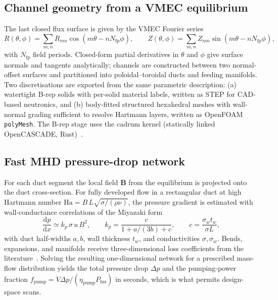 \documentclass{article}
\newcommand{\Ha}{\mathrm{Ha}}
\begin{document}
\subsection{Channel geometry from a VMEC equilibrium}

The last closed flux surface is given by the VMEC Fourier series
\begin{equation}
R(\theta,\phi) = \sum_{m,n} R_{mn}\cos(m\theta - nN_{\mathrm{fp}}\phi),\qquad
Z(\theta,\phi) = \sum_{m,n} Z_{mn}\sin(m\theta - nN_{\mathrm{fp}}\phi),
\end{equation}
with $N_{\mathrm{fp}}$ field periods. Closed-form partial derivatives in $\theta$
and $\phi$ give surface normals and tangents analytically; channels are constructed
between two normal-offset surfaces and partitioned into poloidal--toroidal ducts and
feeding manifolds. Two discretisations are exported from the same parametric
description: (a) watertight B-rep solids with per-solid material labels, written as
STEP for CAD-based neutronics, and (b) body-fitted structured hexahedral meshes with
wall-normal grading sufficient to resolve Hartmann layers, written as OpenFOAM
\texttt{polyMesh}. The B-rep stage uses the cadrum kernel (statically linked
OpenCASCADE, Rust)~\cite{cadrum}.

\subsection{Fast MHD pressure-drop network}

For each duct segment the local field $\mathbf{B}$ from the equilibrium is projected
onto the duct cross-section. For fully developed flow in a rectangular duct at high
Hartmann number
$\Ha = B\,L\sqrt{\sigma/(\rho\nu)}$,
the pressure gradient is estimated with wall-conductance correlations of the
Miyazaki form~\cite{miyazaki1986}
\begin{equation}
\frac{\mathrm{d}p}{\mathrm{d}x} \simeq k_p\,\sigma\,u\,B^2,\qquad
k_p = \frac{c}{1+a/(3b)+c},\qquad
c = \frac{\sigma_w t_w}{\sigma L},
\end{equation}
with duct half-widths $a,b$, wall thickness $t_w$, and conductivities
$\sigma,\sigma_w$. Bends, expansions, and manifolds receive three-dimensional loss
coefficients from the literature~\cite{smolentsev2010}. Solving the resulting
one-dimensional network for a prescribed mass-flow distribution yields the total
pressure drop $\Delta p$ and the pumping-power fraction
$f_{\mathrm{pump}} = \dot{V}\Delta p / (\eta_{\mathrm{pump}} P_{\mathrm{fus}})$
in seconds, which is what permits design-space scans.
\end{document}
